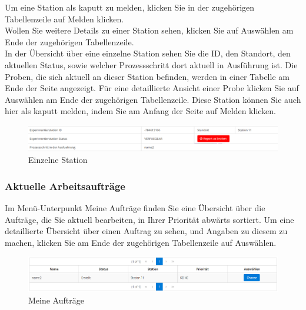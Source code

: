 \documentclass[enabledeprecatedfontcommands,fontsize=12pt,paper=a4,twoside]{scrartcl}
\begin{document}
Um eine Station als kaputt zu melden, klicken Sie in der zugehörigen Tabellenzeile auf Melden klicken. \\

Wollen Sie weitere Details zu einer Station sehen, klicken Sie auf Auswählen am Ende der zugehörigen Tabellenzeile. \\

In der Übersicht über eine einzelne Station sehen Sie die ID, den Standort, den aktuellen Status, sowie welcher Prozessschritt dort aktuell in Ausführung ist. Die Proben, die sich aktuell an dieser Station befinden, werden in einer Tabelle am Ende der Seite angezeigt. Für eine detaillierte Ansicht einer Probe klicken Sie auf Auswählen am Ende der zugehörigen Tabellenzeile. Diese Station können Sie auch hier als kaputt melden, indem Sie am Anfang der Seite auf Melden klicken. \\
\begin{figure}[h!]
\begin{center}
 \includegraphics[width=\textwidth]{screenshots/t/stationformular.png}
  \caption{Einzelne Station}
  \label{fig:boat1}
\end{center}
\end{figure}


\subsubsection{Aktuelle Arbeitsaufträge}
Im Menü-Unterpunkt Meine Aufträge finden Sie eine Übersicht über die Aufträge, die Sie aktuell bearbeiten, in Ihrer Priorität abwärts sortiert. Um eine detaillierte Übersicht über einen Auftrag zu sehen, und Angaben zu diesem zu machen, klicken Sie am Ende der zugehörigen Tabellenzeile auf Auswählen. \\
\begin{figure}[h!]
\begin{center}
 \includegraphics[width=\textwidth]{screenshots/t/meineauftrage.png}
  \caption{Meine Aufträge}
  \label{fig:boat1}
\end{center}
\end{figure}
\end{document}
